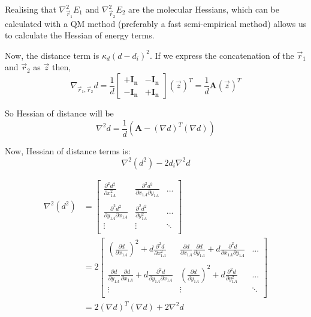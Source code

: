 \documentclass[10pt]{article}
\begin{document}
Realising that $\nabla^2_{\vec{r}_1}E_1$ and $\nabla^2_{\vec{r}_2}E_2$ are the molecular Hessians, which can be calculated with a QM method (preferably a fast semi-empirical method) allows us to calculate the Hessian of energy terms.

Now, the distance term is $\kappa_d (d-d_i)^2$. If we express the concatenation of the $\vec{r}_1$ and $\vec{r}_2$ as $\vec{z}$ then,
$$\nabla_{\vec r_1,\vec r_2} d = \frac{1}{d} \begin{bmatrix}
	\mathbf{+I_n }& \mathbf{-I_n} \\
	\mathbf{-I_n}  & \mathbf{+I_n} 
\end{bmatrix} (\vec{z})^T = \frac{1}{d} \mathbf{A} (\vec{z})^T$$ 

So Hessian of distance will be
$$\nabla^2 d = \frac{1}{d} (\mathbf{A} - (\nabla d)^T (\nabla d))$$

Now, Hessian of distance terms is:
$$\nabla^2 (d^2) - 2 d_i \nabla^2 d$$

\begin{equation}
\begin{split}
	\nabla^2 (d^2) & = 
	\begin{bmatrix}
		\frac{\partial^2 d^2}{\partial x_{1A}^2} & \frac{\partial^2 d^2}{\partial x_{1A}\partial y_{1A}} & ... \\ \\
		\frac{\partial^2 d^2}{\partial y_{1A}\partial x_{1A}} & \frac{\partial^2 d^2}{\partial y_{1A}^2} & ... \\ 
		\vdots & \vdots & \ddots \\
	\end{bmatrix} \\
	& = 2 \begin{bmatrix}
		(\frac{\partial d}{\partial x_{1A}})^2 + d \frac{\partial^2 d}{\partial x_{1A}^2} & \frac{\partial d}{\partial x_{1A}}\frac{\partial d}{\partial y_{1A}} + d \frac{\partial^2 d}{\partial x_{1A}\partial y_{1A}} & ... \\ \\
		\frac{\partial d}{\partial y_{1A}}\frac{\partial d}{\partial x_{1A}} + d\frac{\partial^2 d}{\partial y_{1A}\partial x_{1A}} & (\frac{\partial d}{\partial y_{1A}})^2 + d \frac{\partial^2 d}{\partial y_{1A}^2} & ... \\ 
		\vdots & \vdots & \ddots \\
	\end{bmatrix} \\
	& = 2 (\nabla d)^T (\nabla d) + 2 \nabla^2 d
\end{split}
\end{equation}
\end{document}
